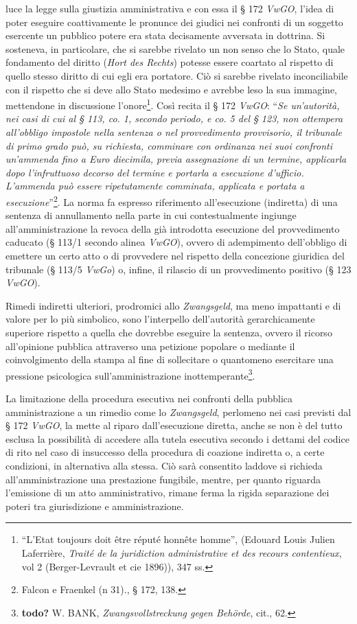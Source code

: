 \documentclass[12pt,it,a4paper,]{report}
\begin{document}
luce la legge sulla giustizia amministrativa e con essa il § 172
\emph{VwGO}, l'idea di poter eseguire coattivamente le pronunce dei
giudici nei confronti di un soggetto esercente un pubblico potere era
stata decisamente avversata in dottrina. Si sosteneva, in particolare,
che si sarebbe rivelato un non senso che lo Stato, quale fondamento del
diritto (\emph{Hort des Rechts}) potesse essere coartato al rispetto di
quello stesso diritto di cui egli era portatore. Ciò si sarebbe rivelato
inconciliabile con il rispetto che si deve allo Stato medesimo e avrebbe
leso la sua immagine, mettendone in discussione l'onore\footnote{``L'Etat
  toujours doit être réputé honnête homme'', (Edouard Louis Julien
  Laferrière, \emph{Traité de la juridiction administrative et des
  recours contentieux}, vol 2 (Berger-Levrault et cie 1896)), 347 ss.}.
Così recita il § 172 \emph{VwGO}: ``\emph{Se un'autorità, nei casi di
cui al § 113, co. 1, secondo periodo, e co. 5 del § 123, non ottempera
all'obbligo impostole nella sentenza o nel provvedimento provvisorio, il
tribunale di primo grado può, su richiesta, comminare con ordinanza nei
suoi confronti un'ammenda fino a Euro diecimila, previa assegnazione di
un termine, applicarla dopo l'infruttuoso decorso del termine e portarla
a esecuzione d'ufficio. L'ammenda può essere ripetutamente comminata,
applicata e portata a esecuzione}''\footnote{{Falcon e Fraenkel (n
  31).}, § 172, 138.}. La norma fa espresso riferimento all'esecuzione
(indiretta) di una sentenza di annullamento nella parte in cui
contestualmente ingiunge all'amministrazione la revoca della già
introdotta esecuzione del provvedimento caducato (§ 113/1 secondo alinea
\emph{VwGO}), ovvero di adempimento dell'obbligo di emettere un certo
atto o di provvedere nel rispetto della concezione giuridica del
tribunale (§ 113/5 \emph{VwGo}) o, infine, il rilascio di un
provvedimento positivo (§ 123 \emph{VwGO}).

Rimedi indiretti ulteriori, prodromici allo \emph{Zwangsgeld}, ma meno
impattanti e di valore per lo più simbolico, sono l'interpello
dell'autorità gerarchicamente superiore rispetto a quella che dovrebbe
eseguire la sentenza, ovvero il ricorso all'opinione pubblica attraverso
una petizione popolare o mediante il coinvolgimento della stampa al fine
di sollecitare o quantomeno esercitare una pressione psicologica
sull'amministrazione inottemperante\footnote{\textbf{todo?} W. BANK,
  \emph{Zwangsvollstreckung gegen Behörde}, cit., 62.}.

La limitazione della procedura esecutiva nei confronti della pubblica
amministrazione a un rimedio come lo \emph{Zwangsgeld}, perlomeno nei
casi previsti dal § 172 \emph{VwGO}, la mette al riparo dall'esecuzione
diretta, anche se non è del tutto esclusa la possibilità di accedere
alla tutela esecutiva secondo i dettami del codice di rito nel caso di
insuccesso della procedura di coazione indiretta o, a certe condizioni,
in alternativa alla stessa. Ciò sarà consentito laddove si richieda
all'amministrazione una prestazione fungibile, mentre, per quanto
riguarda l'emissione di un atto amministrativo, rimane ferma la rigida
separazione dei poteri tra giurisdizione e amministrazione.
\end{document}
